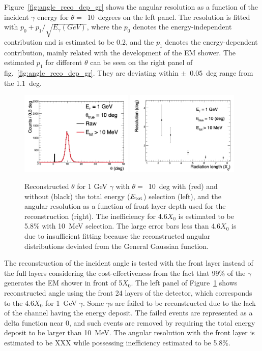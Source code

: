\documentclass[jkps,preprint,fleqn,showpacs,showkeys]{revtex4}
\begin{document}
Figure~\ref{fig:angle_reco_dep_gr} shows the angular resolution as a function of the incident $\gamma$ energy for $\theta=$~10~degrees on the left panel. The resolution is fitted with $p_{0} + p_{1}/\sqrt{E_{\gamma}(GeV)}$, where the $p_{0}$ denotes the energy-independent contribution and is estimated to be 0.2, and the $p_{1}$ denotes the energy-dependent contribution, mainly related with the development of the EM shower. The estimated $p_{1}$ for different $\theta$ can be seen on the right panel of fig.~\ref{fig:angle_reco_dep_gr}. They are deviating within $\pm$~0.05~deg range from the 1.1~deg.

\begin{figure}[!hbt]
\includegraphics[width=0.48\textwidth]{figures/res_Nlayer.jpg}
\includegraphics[width=0.48\textwidth]{figures/resol_Nlayer.jpg}
\caption{ Reconstructed $\theta$ for 1 GeV $\gamma$ with $\theta=$~10~deg with (red) and without (black) the total energy ($E_{\rm{tot}}$) selection (left), and the angular resolution as a function of front layer depth used for the reconstruction (right). The inefficiency for 4.6$X_{0}$ is estimated to be 5.8\% with 10~MeV selection. The large error bars less than 4.6$X_{0}$ is due to insufficient fitting because the reconstructed angular distributions deviated from the General Gaussian function.}
\label{fig:angle_reco_layer}
\end{figure}

The reconstruction of the incident angle is tested with the front layer instead of the full layers considering the cost-effectiveness from the fact that 99\% of the $\gamma$ generates the EM shower in front of 5$X_{0}$. The left panel of Figure~\ref{fig:angle_reco_layer} shows reconstructed angle using the front 24 layers of the detector, which corresponds to the 4.6$X_{0}$ for 1~GeV $\gamma$. Some $\gamma$s are failed to be reconstructed due to the lack of the channel having the energy deposit. The failed events are represented as a delta function near 0, and such events are removed by requiring the total energy deposit to be larger than 10~MeV. The angular resolution with the front layer is estimated to be XXX while possessing inefficiency estimated to be 5.8\%.
\end{document}
